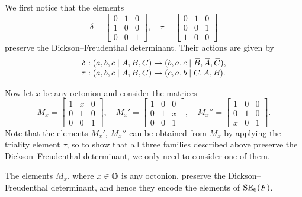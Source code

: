 We first notice that the elements 
\begin{equation}
	\label{eq:delta_tau}
	\delta = \begin{bmatrix}
		0 & 1 & 0 \\
		1 & 0 & 0 \\
		0 & 0 & 1
	\end{bmatrix},\quad 
	\tau = \begin{bmatrix}
		0 & 1 & 0 \\
		0 & 0 & 1 \\
		1 & 0 & 0
	\end{bmatrix}
\end{equation}
preserve the Dickson--Freudenthal determinant. Their actions are given by
\begin{equation}
	\begin{array}{r@{\;}c@{\;}l}
		\delta: (a,b,c\mid A,B,C) & \mapsto & (b,a,c\mid \ovB, \ovA, \ovC), \\
		\tau: (a,b,c\mid A,B,C) & \mapsto & (c,a,b\mid C,A,B). 
	\end{array}
\end{equation}

Now let $x$ be any octonion and consider the matrices
\begin{equation}
	M_x = \begin{bmatrix}
		1 & x & 0 \\
		0 & 1 & 0 \\
		0 & 0 & 1 
	\end{bmatrix},\quad 
	M_x' = \begin{bmatrix}
		1 & 0 & 0 \\
		0 & 1 & x \\
		0 & 0 & 1
	\end{bmatrix},\quad 
	M_x'' = \begin{bmatrix}
		1 & 0 & 0 \\
		0 & 1 & 0 \\
		x & 0 & 1
	\end{bmatrix}.
\end{equation}
Note that the elements $M_x'$, $M_x''$ can be obtained from $M_x$ by applying 
the triality element $\tau$, so to show that all three families described above preserve
the Dickson--Freudenthal determinant, we only need to consider one of them. 

\begin{lemma}
	\label{lemma:Mx_det}
	The elements $M_x$, where $x \in \mathbb{O}$ is any octonion, preserve the Dickson--Freudenthal
	determinant, and hence they encode the elements of $\mathrm{SE}_6(F)$. 
\end{lemma} 

